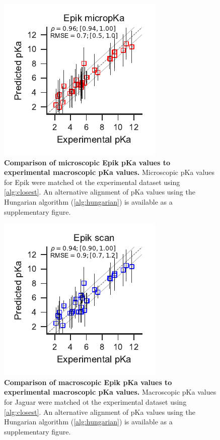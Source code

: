 \documentclass[9pt,lineno,final]{elife}
\begin{document}
\begin{figure}[H]
\centering
\includegraphics[]{closest_pka_epik_micropka.pdf}
\caption{{\bf Comparison of microscopic Epik pKa values to experimental macroscopic pKa values.} Microscopic pKa values for Epik were matched ot the experimental dataset using \cref{alg:closest}. An alternative alignment of pKa values using the Hungarian algorithm (\cref{alg:hungarian}) is available as a supplementary figure. \label{correlation-closest-epiki}}


\end{figure}
    

\begin{figure}[H]
\centering
\includegraphics[]{closest_pka_epik_scan.pdf}
\caption{{\bf Comparison of macroscopic Epik pKa values to experimental macroscopic pKa values.} Macroscopic pKa values for Jaguar were matched ot the experimental dataset using \cref{alg:closest}. An alternative alignment of pKa values using the Hungarian algorithm (\cref{alg:hungarian}) is available as a supplementary figure. \label{correlation-closest-epikiii}}


\end{figure}
    
\end{document}
